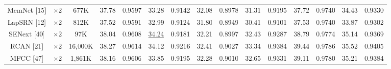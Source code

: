 \documentclass[twocolumn]{svjour3}          %
\begin{document}
\begin{table}
\begin{tabular}{|c|c|c|cc|cc|cc|cc|cc|cc|}
MemNet [15] & $\times 2$&677K& \multicolumn{1}{c|}{37.78} & 0.9597  & \multicolumn{1}{c|}{33.28} &0.9142  &\multicolumn{1}{c|}{32.08} & 0.8978 & \multicolumn{1}{c|}{31.31} &0.9195  & \multicolumn{1}{c|}{37.72} &0.9740
&\multicolumn{1}{c|}{34.43} &0.9330\\

LapSRN [12] & $\times 2$&812K& \multicolumn{1}{c|}{37.52} & 0.9591 & \multicolumn{1}{c|}{32.99} & 0.9124 &\multicolumn{1}{c|}{31.80} & 0.8949 & \multicolumn{1}{c|}{30.41} &  0.9101 & \multicolumn{1}{c|}{37.53} &  0.9740
&\multicolumn{1}{c|}{33.87} & 0.9302\\

SENext [40] & $\times 2$ &97K& \multicolumn{1}{c|}{38.04} & {0.9608} & \multicolumn{1}{c|}{\color{blue}\underline{34.24}} &{ 0.9181} & \multicolumn{1}{c|}{32.21} & {0.8997}& \multicolumn{1}{c|}{32.43} &{0.9287}& \multicolumn{1}{c|}{38.79} &{0.9774} &\multicolumn{1}{c|}{35.14} & {0.9369}\\



RCAN [21]& $\times 2$&16,000K& \multicolumn{1}{c|}{38.27} & 0.9614 & \multicolumn{1}{c|}{34.12} & 0.9216 &\multicolumn{1}{c|}{32.41} & 0.9027& \multicolumn{1}{c|}{33.34} & 0.9384 & \multicolumn{1}{c|}{39.44} & 0.9786
&\multicolumn{1}{c|}{35.52} & 0.9405\\


MFCC [47]& $\times 2$&1,861K& \multicolumn{1}{c|}{38.16} & 0.9606 & \multicolumn{1}{c|}{33.85} &0.9195 &\multicolumn{1}{c|}{32.28} & 0.9010& \multicolumn{1}{c|}{32.65} &0.9331 & \multicolumn{1}{c|}{39.11} & 0.9780
&\multicolumn{1}{c|}{35.21} & 0.9384\\



\end{tabular}
\end{table}
\end{document}
